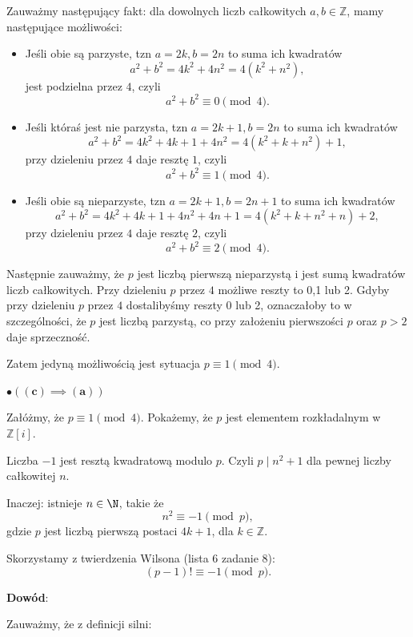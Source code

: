 \begin{solution}
	 Zauważmy następujący fakt: dla dowolnych liczb całkowitych $a,b \in \mathbb{Z}$, mamy następujące możliwości:
	 \begin{itemize}
	 	\item Jeśli obie są parzyste, tzn $a = 2k, b = 2n$ to suma ich kwadratów 
			\[
			 a^2+b^2 = 4k^2+4n^2 = 4\left( k^2+n^2 \right) 
			,\] jest podzielna przez $4$, czyli
			 \[
			a^2+b^2 \equiv 0 \pmod{4} 
			.\] 
		\item Jeśli któraś jest nie parzysta, tzn $a = 2k + 1, b = 2n$ to suma ich kwadratów 
			\[
			 a^2 + b^2 = 4k^2 + 4k + 1 + 4n^2 = 4\left( k^2 + k + n^2 \right) + 1
			,\] 
			przy dzieleniu przez $4$ daje resztę $1$, czyli 
			 \[
			a^2 + b^2 \equiv 1 \pmod{4} 
			.\] 
		\item Jeśli obie są nieparzyste, tzn $a = 2k + 1, b = 2n + 1$ to suma ich kwadratów
			 \[
			a^2+ b^2 = 4k^2 + 4k + 1 + 4n^2 + 4n + 1 = 4\left( k^2 + k + n^2 + n \right) + 2
			,\] 
			przy dzieleniu przez $4$ daje resztę $2$, czyli
			 \[
			a^2 + b^2 \equiv 2 \pmod{4} 
			.\] 
	 \end{itemize}
	 \noindent Następnie zauważmy, że $p$ jest liczbą pierwszą nieparzystą i jest sumą kwadratów liczb całkowitych. Przy dzieleniu $p$ przez $4$ możliwe reszty to 0,1 lub 2. Gdyby przy dzieleniu $p$ przez $4$ dostalibyśmy reszty 0 lub 2, oznaczałoby to w szczególności, że $p$ jest liczbą parzystą, co przy założeniu pierwszości $p$ oraz $p>2$ daje sprzeczność.

	 Zatem jedyną możliwością jest sytuacja $p \equiv 1 \pmod{4} $.
	
	 \noindent$\bullet \bm{\left(\left(c\right)\implies \left(a\right)\right)}$ 

	 Załóżmy, że $p \equiv 1 \pmod{4} $. Pokażemy, że $p$ jest elementem rozkładalnym w $\mathbb{Z}\left[ i \right] $.

	 \begin{lemma}
	 	Liczba $-1$ jest resztą kwadratową modulo $p$. Czyli $p \mid n^2 + 1$ dla pewnej liczby całkowitej $n$. 

		Inaczej: istnieje $n \in \N$, takie że
		\[
		n^2 \equiv -1 \pmod{p} 
		,\]
		gdzie $p$ jest liczbą pierwszą postaci  $4k+1$, dla  $k \in \mathbb{Z}$.

		Skorzystamy z twierdzenia Wilsona (lista 6 zadanie 8):
		\[
			\left( p-1 \right)! \equiv -1 \pmod{p} 
		.\] 

		\noindent \textbf{Dowód}:

		Zauważmy, że z definicji silni:


\end{lemma}
\end{solution}
